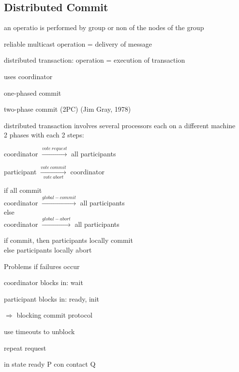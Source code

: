 \documentclass[ngerman,a4paper]{report}
\begin{document}
\subsection{Distributed Commit}
\begin{compactitem}
	\item an operatio is performed by group or non of the nodes of the group
	\item reliable multicast operation = delivery of message
	\item distributed transaction: operation = execution of transaction
	\item uses coordinator
	\item one-phased commit\\
	\item two-phase commit (2PC) (Jim Gray, 1978)
	\begin{compactitem}
	\item distributed transaction involves several processors each on a different machine\\
	2 phases with each 2 steps:\\
	\begin{compactenum}
		\item coordinator $\xrightarrow{vote\ request}$ all participants
		\item participant $\xrightarrow[vote\ abort]{vote\ commit}$ coordinator
		\item if all commit\\
		coordinator $\xrightarrow{global-commit}$ all participants\\
		else\\
		coordinator $\xrightarrow{global-abort}$ all participants\\
		\item if commit, then participants locally commit\\
		else participants locally abort
	\end{compactenum}
	Problems if failures occur\\
	\begin{compactitem}
		\item coordinator blocks in: wait
		\item participant blocks in: ready, init
	\end{compactitem}
	$\Rightarrow$ blocking commit protocol
	\item use timeouts to unblock
	\item repeat request
	\item in state ready P con contact Q\\

\end{compactitem}
\end{compactitem}
\end{document}
